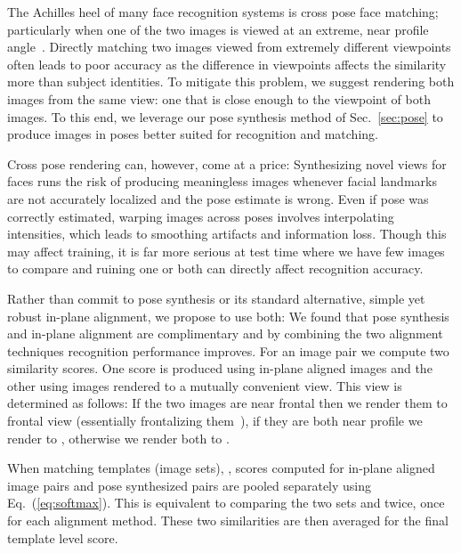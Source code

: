 \documentclass[runningheads]{llncs}
\newcommand{\minisection}[1]{\vspace{0.04in} \noindent {\bf #1:} }
\begin{document}
\minisection{Exploiting pose augmentation at test time}\label{sec:viewbased}
The Achilles heel of many face recognition systems is cross pose face matching; particularly when one of the two images is viewed at an extreme, near profile angle~\cite{yi2013towards,li2013probabilistic,ding2015multi}. Directly matching two images viewed from extremely different viewpoints often leads to poor accuracy as the difference in viewpoints affects the similarity more than subject identities. To mitigate this problem, we suggest rendering both images from the same view: one that is close enough to the viewpoint of both images. To this end, we leverage our pose synthesis method of Sec.~\ref{sec:pose} to produce images in poses better suited for recognition and matching.

Cross pose rendering can, however, come at a price: Synthesizing novel views for faces runs the risk of producing meaningless images whenever facial landmarks are not accurately localized and the pose estimate is wrong. Even if pose was correctly estimated, warping images across poses involves interpolating intensities, which leads to smoothing artifacts and information loss. Though this may affect training, it is far more serious at test time where we have few images to compare and ruining one or both can directly affect recognition accuracy.

Rather than commit to pose synthesis or its standard alternative, simple yet robust in-plane alignment, we propose to use both: We found that pose synthesis and in-plane alignment are complimentary and by combining the two alignment techniques recognition performance improves. For an image pair  we compute two similarity scores. One score is produced using in-plane aligned images and the other using images rendered to a mutually convenient view. This view is determined as follows: If the two images are near frontal then we render them to frontal view (essentially frontalizing them~\cite{hassner2015effective}), if they are both near profile we render to , otherwise we render both to .


When matching templates (image sets), , scores computed for in-plane aligned image pairs and pose synthesized pairs are pooled separately using Eq.~(\ref{eq:softmax}). This is equivalent to comparing the two sets  and  twice, once for each alignment method. These two similarities are then averaged for the final template level score.
\end{document}
